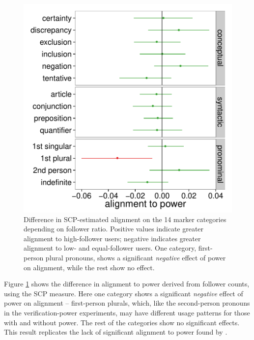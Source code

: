 \documentclass{acm_proc_article-sp}
\begin{document}
\begin{figure}[t]
\centering
\includegraphics[width=.9\columnwidth]{graphics/www2016_dnmpowerdiff_fratio_final.pdf}
\caption{Difference in SCP-estimated alignment on the 14 marker categories depending on follower ratio. Positive values indicate greater alignment to high-follower users; negative indicates greater alignment to low- and equal-follower users. One category, first-person plural pronouns, shows a significant \textit{negative} effect of power on alignment, while the rest show no effect.}\label{fig:dnm-fratio}
\end{figure}

Figure \ref{fig:dnm-fratio} shows the difference in alignment to power derived from follower counts, using the SCP measure. Here one category shows a significant \emph{negative} effect of power on alignment -- first-person plurals, which, like the second-person pronouns in the verification-power experiments, may have different usage patterns for those with and without power.  The rest of the categories show no significant effects.  This result replicates the lack of significant alignment to power found by \cite{DNMGamonDumais2011}.
\end{document}
